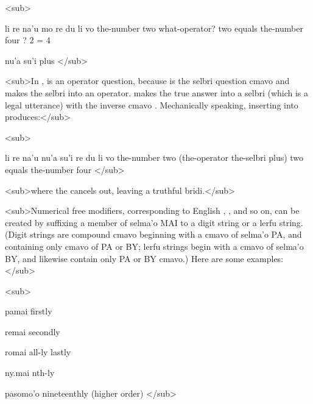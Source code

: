 <sub>
\begin{example}
li re na'u mo re du li vo\n
the-number two what-operator? two equals the-number four ? 2 = 4
\end{example}

\begin{example}
nu'a su'i\n
plus
</sub>
\end{example}

<sub>In ,  is an
    operator question, because  is the selbri question cmavo
    and  makes the selbri into an operator.  makes the true answer 
    into a selbri (which is a legal utterance) with the inverse
    cmavo . Mechanically speaking, inserting  into  produces:</sub>

<sub>
\begin{example}
li re na'u nu'a su'i re du li vo\n
the-number two (the-operator the-selbri plus)\n
\T	two equals the-number four
</sub>
\end{example}

<sub>where the  cancels out, leaving a truthful
    bridi.</sub>

<sub>Numerical free modifiers, corresponding to English
    , , and so on, can be created by
    suffixing a member of selma'o MAI to a digit string or a lerfu
    string. (Digit strings are compound cmavo beginning with a
    cmavo of selma'o PA, and containing only cmavo of PA or BY;
    lerfu strings begin with a cmavo of selma'o BY, and likewise
    contain only PA or BY cmavo.) Here are some examples:</sub>

<sub>
\begin{example}
pamai\n
firstly
\end{example}

\begin{example}
remai\n
secondly
\end{example}

\begin{example}
romai\n
all-ly\n
lastly
\end{example}

\begin{example}
ny.mai\n
nth-ly
\end{example}

\begin{example}
pasomo'o\n
nineteenthly (higher order)\n {}
</sub>
\end{example}

